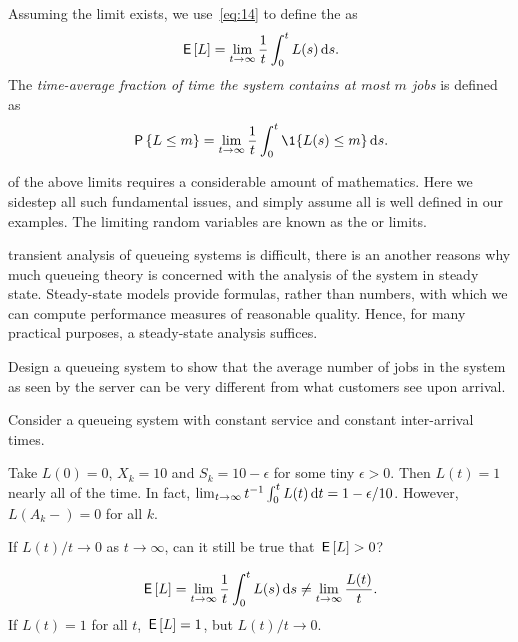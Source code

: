 Assuming the limit exists, we use~\cref{eq:14} to define the  as
\begin{equation} \label{eq:46}
 \,\mathsf{E}\left[L\right] = \lim_{t\to\infty} \frac 1 t\int_0^t L(s) \,\textrm{d}s.
\end{equation}
 The \emph{time-average fraction of time the system contains at most $m$ jobs} is defined as
\begin{equation*}
 \P{\L\leq m} =\lim_{t\to\infty} \frac 1 t\int_0^t \1{\L(s)\leq m} \d s.
\end{equation*}

 of the above limits requires a considerable amount of mathematics.
Here we sidestep all such fundamental issues, and simply assume all is well defined in our examples.
The limiting random variables are known as the  or  limits.

 transient analysis of queueing systems is difficult, there is an another reasons why much queueing theory is concerned with the analysis of the system in steady state.  Steady-state models provide formulas, rather than numbers, with which we can compute performance measures of reasonable quality. Hence, for many practical purposes, a steady-state analysis suffices.

\begin{exercise}\label{ex:l-165}
Design a queueing system to show that the average number of jobs in the system as seen by the server can be very different from what customers see upon arrival.
\begin{hint}
Consider a queueing system with constant service and constant inter-arrival times.
\end{hint}
\begin{solution}
 Take $L(0) = 0$, $X_k = 10$ and $S_k = 10-\epsilon$ for some tiny
 $\epsilon>0$. Then $L(t) = 1$ nearly all of the time. In fact,
 $\lim_{t\to\infty}t^{-1}\int_0^t L(t) \,\textrm{d}t= 1-\epsilon/10$. However, $L(A_k-)=0$ for all $k$.
\end{solution}
\end{exercise}


\begin{exercise}\label{ex:90}
 If $L(t)/t \to 0$ as $t\to\infty$, can it still be true that $\,\mathsf{E}\left[L\right]>0$?
\begin{solution}
 \begin{equation*}
 \,\mathsf{E}\left[L\right] = \lim_{t\to\infty} \frac 1 t \int_0^t L(s) \,\textrm{d}s \neq \lim_{t\to\infty} \frac{L(t)}t.
 \end{equation*}
If $L(t)=1$ for all $t$, $\,\mathsf{E}\left[L\right] =1 $, but $L(t)/t \to 0$.
\end{solution}
\end{exercise}


